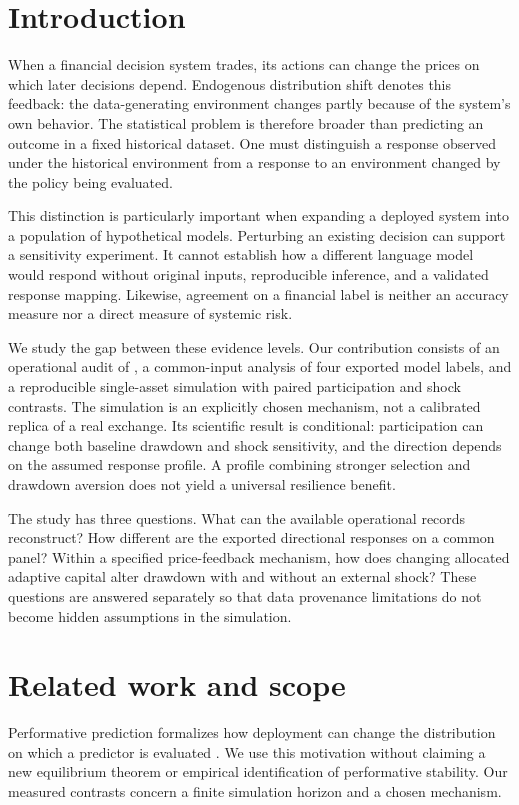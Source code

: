 \section{Introduction}
When a financial decision system trades, its actions can change the prices on which later decisions depend. Endogenous distribution shift denotes this feedback: the data-generating environment changes partly because of the system's own behavior. The statistical problem is therefore broader than predicting an outcome in a fixed historical dataset. One must distinguish a response observed under the historical environment from a response to an environment changed by the policy being evaluated.

This distinction is particularly important when expanding a deployed system into a population of hypothetical models. Perturbing an existing decision can support a sensitivity experiment. It cannot establish how a different language model would respond without original inputs, reproducible inference, and a validated response mapping. Likewise, agreement on a financial label is neither an accuracy measure nor a direct measure of systemic risk.

We study the gap between these evidence levels. Our contribution consists of an operational audit of \systemname{}, a common-input analysis of four exported model labels, and a reproducible single-asset simulation with paired participation and shock contrasts. The simulation is an explicitly chosen mechanism, not a calibrated replica of a real exchange. Its scientific result is conditional: participation can change both baseline drawdown and shock sensitivity, and the direction depends on the assumed response profile. A profile combining stronger selection and drawdown aversion does not yield a universal resilience benefit.

The study has three questions. What can the available operational records reconstruct? How different are the exported directional responses on a common panel? Within a specified price-feedback mechanism, how does changing allocated adaptive capital alter drawdown with and without an external shock? These questions are answered separately so that data provenance limitations do not become hidden assumptions in the simulation.

\section{Related work and scope}
Performative prediction formalizes how deployment can change the distribution on which a predictor is evaluated \citep{perdomo2020performative}. We use this motivation without claiming a new equilibrium theorem or empirical identification of performative stability. Our measured contrasts concern a finite simulation horizon and a chosen mechanism.

